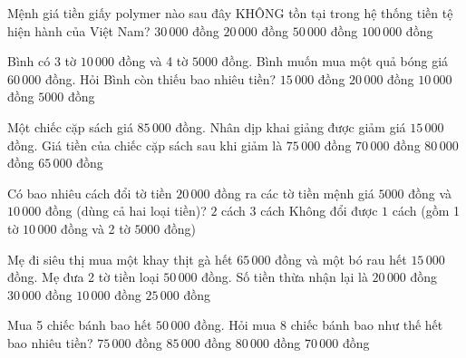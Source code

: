 \begin{ex} %
Mệnh giá tiền giấy polymer nào sau đây KHÔNG tồn tại trong hệ thống tiền tệ hiện hành của Việt Nam?
\choice
{\True $30\,000$ đồng}
{$20\,000$ đồng}
{$50\,000$ đồng}
{$100\,000$ đồng}
\end{ex}

\begin{ex} %
Bình có 3 tờ $10\,000$ đồng và 4 tờ $5000$ đồng. Bình muốn mua một quả bóng giá $60\,000$ đồng. Hỏi Bình còn thiếu bao nhiêu tiền?
\choice
{$15\,000$ đồng}
{$20\,000$ đồng}
{\True $10\,000$ đồng}
{$5000$ đồng}
\end{ex}

\begin{ex} %
Một chiếc cặp sách giá $85\,000$ đồng. Nhân dịp khai giảng được giảm giá $15\,000$ đồng. Giá tiền của chiếc cặp sách sau khi giảm là
\choice
{$75\,000$ đồng}
{\True $70\,000$ đồng}
{$80\,000$ đồng}
{$65\,000$ đồng}
\end{ex}

\begin{ex} %
Có bao nhiêu cách đổi tờ tiền $20\,000$ đồng ra các tờ tiền mệnh giá $5000$ đồng và $10\,000$ đồng (dùng cả hai loại tiền)?
\choice
{$2$ cách}
{$3$ cách}
{Không đổi được}
{\True $1$ cách (gồm 1 tờ $10\,000$ đồng và 2 tờ $5000$ đồng)}
\end{ex}

\begin{ex} %
Mẹ đi siêu thị mua một khay thịt gà hết $65\,000$ đồng và một bó rau hết $15\,000$ đồng. Mẹ đưa 2 tờ tiền loại $50\,000$ đồng. Số tiền thừa nhận lại là
\choice
{\True $20\,000$ đồng}
{$30\,000$ đồng}
{$10\,000$ đồng}
{$25\,000$ đồng}
\end{ex}

\begin{ex} %
Mua 5 chiếc bánh bao hết $50\,000$ đồng. Hỏi mua 8 chiếc bánh bao như thế hết bao nhiêu tiền?
\choice
{$75\,000$ đồng}
{$85\,000$ đồng}
{\True $80\,000$ đồng}
{$70\,000$ đồng}
\end{ex}

